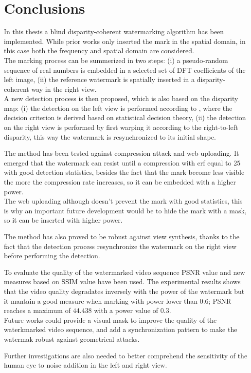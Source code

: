 \chapter{Conclusions}
\label{concl}

In this thesis a blind disparity-coherent watermarking algorithm has been implemented. While prior works only inserted the mark in the spatial domain, in this case both the frequency and spatial domain are considered. \\
The marking process can be summerized in two steps: (i) a pseudo-random sequence of real numbers is embedded in a selected set of DFT coefficients of the left image, (ii) the reference watermark is spatially inserted in a disparity-coherent way in the right view.\\ 
A new detection process is then proposed, which is also based on the disparity map: (i) the detection on the left view is performed according to \cite{PIVA}, where the decision criterion is derived based on statistical decision theory, (ii) the detection on the right view is performed by first warping it according to the right-to-left disparity, this way the watermark is resynchronized to its initial shape.
 
The method has been tested against compression attack and web uploading. It emerged that the watermark can resist until a compression with crf equal to 25 with good detection statistics, besides the fact that the mark become less visible the more the compression rate increases, so it can be embedded with a higher power.\\
The web uploading although doesn't prevent the mark with good statistics, this is why an important future development would be to hide the mark with a mask, so it can be inserted with higher power.

The method has also proved to be robust against view synthesis, thanks to the fact that the detection process resynchronize the watermark on the right view before performing the detection.

To evaluate the quality of the watermarked video sequence PSNR value and new measures based on SSIM value have been used. The experimental results shows that the video quality degradates inversely with the power of the watermark but it mantain a good measure when marking with power lower than 0.6; PSNR reaches a maximum of  $44.438$ with a power value of $0.3$.\\

Future works could provide a visual mask to improve the quality of the waterkmarked video sequence, and add a synchronization pattern to make the watermak robust against geometrical attacks. 

Further investigations are also needed to better comprehend the sensitivity of the human eye to noise addition in the left and right view.



